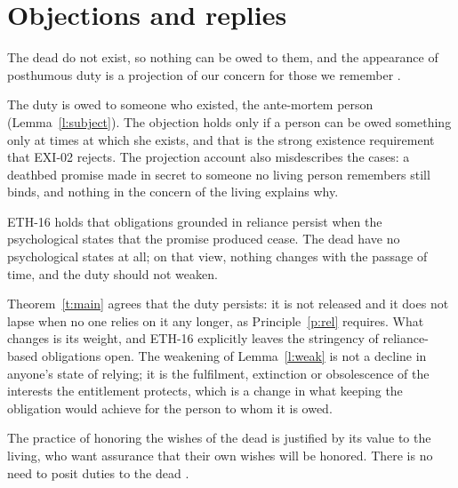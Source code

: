 \documentclass{situationist-preprint}
\begin{document}
\section{Objections and replies}

\begin{objection}[No subject]\label{o:nosub}
The dead do not exist, so nothing can be owed to them, and the appearance of posthumous duty is a projection of our concern for those we remember \citep{Callahan1987}.
\end{objection}

\begin{reply}
The duty is owed to someone who existed, the ante-mortem person (Lemma~\ref{l:subject}). The objection holds only if a person can be owed something only at times at which she exists, and that is the strong existence requirement that EXI-02 rejects. The projection account also misdescribes the cases: a deathbed promise made in secret to someone no living person remembers still binds, and nothing in the concern of the living explains why.
\end{reply}

\begin{objection}[Persistence]\label{o:persist}
ETH-16 holds that obligations grounded in reliance persist when the psychological states that the promise produced cease. The dead have no psychological states at all; on that view, nothing changes with the passage of time, and the duty should not weaken.
\end{objection}

\begin{reply}
Theorem~\ref{t:main} agrees that the duty persists: it is not released and it does not lapse when no one relies on it any longer, as Principle~\ref{p:rel} requires. What changes is its weight, and ETH-16 explicitly leaves the stringency of reliance-based obligations open. The weakening of Lemma~\ref{l:weak} is not a decline in anyone's state of relying; it is the fulfilment, extinction or obsolescence of the interests the entitlement protects, which is a change in what keeping the obligation would achieve for the person to whom it is owed.
\end{reply}

\begin{objection}\label{o:part}
The practice of honoring the wishes of the dead is justified by its value to the living, who want assurance that their own wishes will be honored. There is no need to posit duties to the dead \citep{Partridge1981}.
\end{objection}
\end{document}

